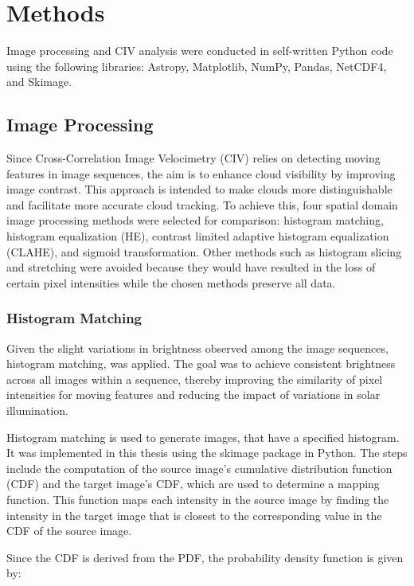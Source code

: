 \chapter{Methods\label{chap:methods}}

Image processing and CIV analysis were conducted in self-written Python code using the following libraries: Astropy, Matplotlib, NumPy, Pandas, NetCDF4, and Skimage.

\section{Image Processing}

Since Cross-Correlation Image Velocimetry (CIV) relies on detecting moving features in image sequences, the aim is to enhance cloud visibility by improving image contrast. This approach is intended to make clouds more distinguishable and facilitate more accurate cloud tracking. To achieve this, four spatial domain image processing methods were selected for comparison: histogram matching, histogram equalization (HE), contrast limited adaptive histogram equalization (CLAHE), and sigmoid transformation. Other methods such as histogram slicing and stretching were avoided because they would have resulted in the loss of certain pixel intensities while the chosen methods preserve all data.

\subsection{Histogram Matching}

Given the slight variations in brightness observed among the image sequences, histogram matching, was applied. The goal was to achieve consistent brightness across all images within a sequence, thereby improving the similarity of pixel intensities for moving features and reducing the impact of variations in solar illumination.

Histogram matching is used to generate images, that have a specified histogram. It was implemented in this thesis using the skimage package in Python. The steps include the computation of the source image’s cumulative distribution function (CDF) and the target image’s CDF, which are used to determine a mapping function\cite{Gonzalez2018}. This function maps each intensity in the source image by finding the intensity in the target image that is closest to the corresponding value in the CDF of the source image. 

Since the CDF is derived from the PDF, the probability density function is given by\cite{Gonzalez2018}: 

